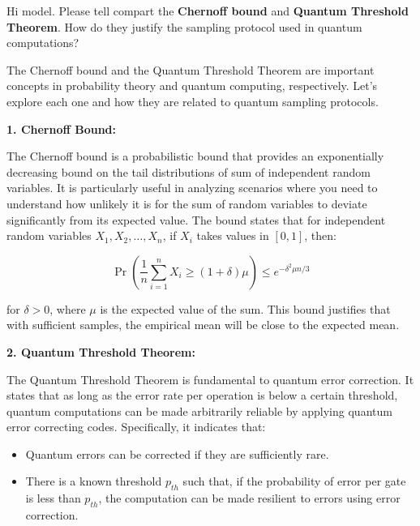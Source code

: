 \begin{ai}
Hi model. Please tell compart the \textbf{Chernoff bound} and \textbf{Quantum
Threshold Theorem}. How do they justify the sampling protocol used in quantum
computations?
\end{ai}

\begin{airesult}
The Chernoff bound and the Quantum Threshold Theorem are important concepts in
probability theory and quantum computing, respectively. Let's explore each one
and how they are related to quantum sampling protocols.

\vsp

\textbf{1. Chernoff Bound:}

The Chernoff bound is a probabilistic bound that provides an exponentially
decreasing bound on the tail distributions of sum of independent random
variables. It is particularly useful in analyzing scenarios where you need to
understand how unlikely it is for the sum of random variables to deviate
significantly from its expected value. The bound states that for independent
random variables \( X_1, X_2, \ldots, X_n \), if \( X_i \) takes values in \([0,
1]\), then:

\[
\Pr\left(\frac{1}{n}\sum_{i=1}^{n} X_i \geq (1+\delta)\mu \right) \leq
e^{-\delta^2 \mu n / 3}
\]

for \( \delta > 0 \), where \( \mu \) is the expected value of the sum. This
bound justifies that with sufficient samples, the empirical mean will be close
to the expected mean.

\vsp

\textbf{2. Quantum Threshold Theorem:}

The Quantum Threshold Theorem is fundamental to quantum error correction. It
states that as long as the error rate per operation is below a certain
threshold, quantum computations can be made arbitrarily reliable by applying
quantum error correcting codes. Specifically, it indicates that:

\begin{itemize}
  \item Quantum errors can be corrected if they are sufficiently rare.
  \item There is a known threshold \( p_{th} \) such that, if the probability of
error per gate is less than \( p_{th} \), the computation can be made resilient
to errors using error correction.
\end{itemize}

\vsp


\end{airesult}
